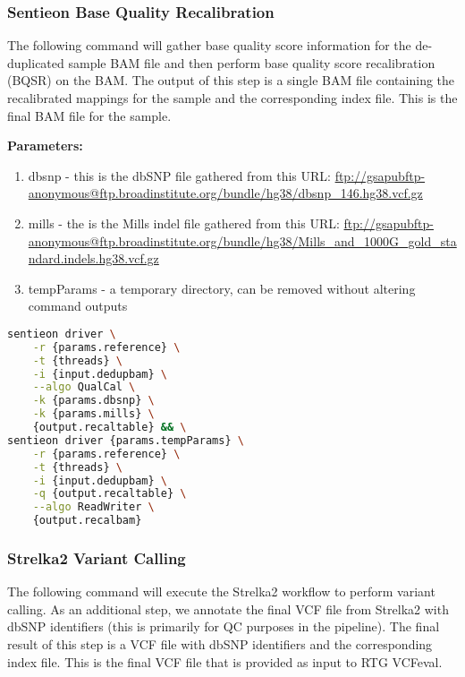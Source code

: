 \subsubsection{Sentieon Base Quality Recalibration}
The following command will gather base quality score information for the de-duplicated sample BAM file and then perform base quality score recalibration (BQSR) on the BAM.  The output of this step is a single BAM file containing the recalibrated mappings for the sample and the corresponding index file.  This is the final BAM file for the sample.

\noindent\textbf{Parameters:}
\begin{enumerate}
    \item dbsnp - this is the dbSNP file gathered from this URL: \url{ftp://gsapubftp-anonymous@ftp.broadinstitute.org/bundle/hg38/dbsnp_146.hg38.vcf.gz}
    \item mills - the is the Mills indel file gathered from this URL: \url{ftp://gsapubftp-anonymous@ftp.broadinstitute.org/bundle/hg38/Mills_and_1000G_gold_standard.indels.hg38.vcf.gz}
    \item tempParams - a temporary directory, can be removed without altering command outputs
\end{enumerate}

\begin{lstlisting}[language=bash]
sentieon driver \
    -r {params.reference} \
    -t {threads} \
    -i {input.dedupbam} \
    --algo QualCal \
    -k {params.dbsnp} \
    -k {params.mills} \
    {output.recaltable} && \
sentieon driver {params.tempParams} \
    -r {params.reference} \
    -t {threads} \
    -i {input.dedupbam} \
    -q {output.recaltable} \
    --algo ReadWriter \
    {output.recalbam}
\end{lstlisting}

\subsubsection{Strelka2 Variant Calling}
The following command will execute the Strelka2 workflow to perform variant calling.  As an additional step, we annotate the final VCF file from Strelka2 with dbSNP identifiers (this is primarily for QC purposes in the pipeline).  The final result of this step is a VCF file with dbSNP identifiers and the corresponding index file.  This is the final VCF file that is provided as input to RTG VCFeval.

